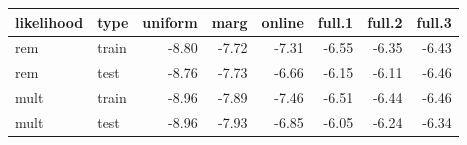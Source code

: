 \begin{table}[ht]
\begin{center}
\begin{tabular}{llrrrrrr}
  \hline
likelihood & type & uniform & marg & online & full.1 & full.2 & full.3 \\ 
  \hline
rem & train & -8.80 & -7.72 & -7.31 & -6.55 & -6.35 & -6.43 \\ 
  rem & test & -8.76 & -7.73 & -6.66 & -6.15 & -6.11 & -6.46 \\ 
  mult & train & -8.96 & -7.89 & -7.46 & -6.51 & -6.44 & -6.46 \\ 
  mult & test & -8.96 & -7.93 & -6.85 & -6.05 & -6.24 & -6.34 \\ 
   \hline
\end{tabular}
\end{center}
\end{table}
